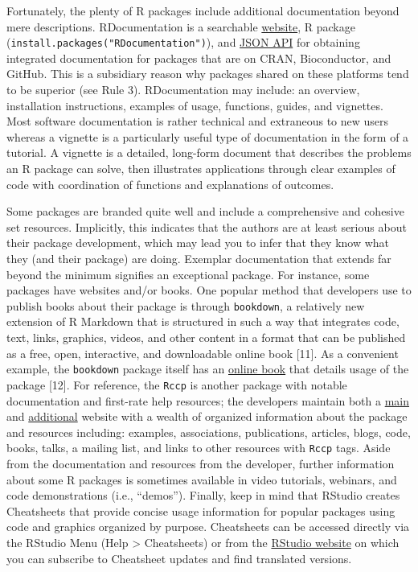 \documentclass[10pt,letterpaper]{article}
\begin{document}
Fortunately, the plenty of R packages include additional documentation
beyond mere descriptions. RDocumentation is a searchable
\href{https://www.rdocumentation.org/}{website}, R package
(\texttt{install.packages("RDocumentation")}), and
\href{https://www.rdocumentation.org/docs/}{JSON API} for obtaining
integrated documentation for packages that are on CRAN, Bioconductor,
and GitHub. This is a subsidiary reason why packages shared on these
platforms tend to be superior (see Rule 3). RDocumentation may include:
an overview, installation instructions, examples of usage, functions,
guides, and vignettes. Most software documentation is rather technical
and extraneous to new users whereas a vignette is a particularly useful
type of documentation in the form of a tutorial. A vignette is a
detailed, long-form document that describes the problems an R package
can solve, then illustrates applications through clear examples of code
with coordination of functions and explanations of outcomes.

Some packages are branded quite well and include a comprehensive and
cohesive set resources. Implicitly, this indicates that the authors are
at least serious about their package development, which may lead you to
infer that they know what they (and their package) are doing. Exemplar
documentation that extends far beyond the minimum signifies an
exceptional package. For instance, some packages have websites and/or
books. One popular method that developers use to publish books about
their package is through \texttt{bookdown}, a relatively new extension
of R Markdown that is structured in such a way that integrates code,
text, links, graphics, videos, and other content in a format that can be
published as a free, open, interactive, and downloadable online book
{[}11{]}. As a convenient example, the \texttt{bookdown} package itself
has an \href{https://bookdown.org/yihui/bookdown/}{online book} that
details usage of the package {[}12{]}. For reference, the \texttt{Rccp}
is another package with notable documentation and first-rate help
resources; the developers maintain both a
\href{http://www.rcpp.org/}{main} and
\href{http://dirk.eddelbuettel.com/code/rcpp.html}{additional} website
with a wealth of organized information about the package and resources
including: examples, associations, publications, articles, blogs, code,
books, talks, a mailing list, and links to other resources with
\texttt{Rccp} tags. Aside from the documentation and resources from the
developer, further information about some R packages is sometimes
available in video tutorials, webinars, and code demonstrations (i.e.,
``demos''). Finally, keep in mind that RStudio creates Cheatsheets that
provide concise usage information for popular packages using code and
graphics organized by purpose. Cheatsheets can be accessed directly via
the RStudio Menu (Help \textgreater{} Cheatsheets) or from the
\href{https://rstudio.com/resources/cheatsheets/}{RStudio website} on
which you can subscribe to Cheatsheet updates and find translated
versions.
\end{document}
